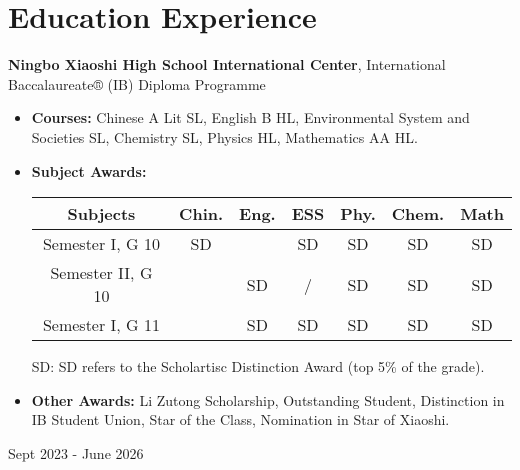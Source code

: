 \documentclass[10pt, letterpaper]{article}
\newenvironment{highlights}{
    \begin{itemize}[
        topsep=0.10 cm,
        parsep=0.10 cm,
        partopsep=0pt,
        itemsep=0pt,
        leftmargin=0.4 cm + 10pt
    ]
}{
    \end{itemize}
} %
\newenvironment{twocolentry}[2][]{
    \onecolentry
    \def\secondColumn{#2}
    \setcolumnwidth{\fill, 4.5 cm}
    \begin{paracol}{2}
}{
    \switchcolumn \raggedleft \secondColumn
    \end{paracol}
    \endonecolentry
} %
\let\hrefWithoutArrow\href
\renewcommand{\href}[2]{\hrefWithoutArrow{#1}{\ifthenelse{\equal{#2}{}}{ }{#2 }\raisebox{.15ex}{\footnotesize \faExternalLink*}}}
\begin{document}
    \section{Education Experience}
        \begin{twocolentry}{ Sept 2023 - June 2026 }
            \textbf{Ningbo Xiaoshi High School International Center}, International Baccalaureate® (IB) Diploma Programme
            \begin{highlights}
                \item \textbf{Courses:} Chinese A Lit SL, English B HL, Environmental System and Societies SL, Chemistry SL, Physics HL, Mathematics AA HL.
                \item \textbf{Subject Awards:}
                
                \vspace{0.2cm}
                \begin{tabular}{ c c c c c c c }
                    \hline
                    Subjects & Chin. & Eng. & ESS & Phy. & Chem. & Math \\ \hline
                    Semester I, G 10 & SD &  & SD & SD & SD & SD \\ %
                    Semester II, G 10 &  & SD & / & SD & SD & SD \\ 
                    Semester I, G 11 &  & SD & SD & SD & SD & SD \\\hline
                \end{tabular}
                \vspace{0.1cm} 
                
                {
                    \small

                SD: SD refers to the Scholartisc Distinction Award (top 5\% of the grade). %
                
                }
                
                \item \textbf{Other Awards:}
                Li Zutong Scholarship, Outstanding Student, Distinction in IB Student Union, Star of the Class, Nomination in Star of Xiaoshi.
                
                
            \end{highlights}
        \end{twocolentry}
\end{document}
